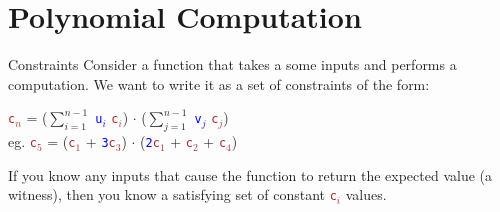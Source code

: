 \documentclass[dvipsnames]{beamer}
\newcommand{\pub}[1]{\textcolor{blue}{\texttt{#1}}}
\newcommand{\priv}[1]{\textcolor{brown}{\texttt{#1}}}
\begin{document}
    \section{Polynomial Computation}

    \begin{frame}{Constraints}
        Consider a function that takes a some inputs and performs a computation. We want to write it as a set of constraints of the form:\\

        \begin{center}
            \priv{c$_n$} = ($\sum_{i=1}^{n-1}$ \pub{u$_i$} \priv{c$_i$}) $\cdot$ ($\sum_{j=1}^{n-1}$ \pub{v$_j$} \priv{c$_j$})\\
            \vspace{0.5cm}
            eg. \priv{c$_5$} = (\priv{c$_1$} + \pub{3}\priv{c$_3$}) $\cdot$ (\pub{2}\priv{c$_1$} + \priv{c$_2$} + \priv{c$_4$})
        \end{center}

        If you know any inputs that cause the function to return the expected value (a witness), then you know a satisfying set of constant \priv{c$_i$} values.
    \end{frame}
\end{document}
